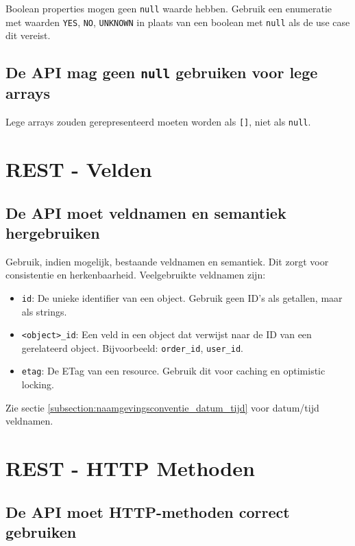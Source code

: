 Boolean properties mogen geen \texttt{null} waarde hebben. Gebruik een enumeratie met waarden \texttt{YES}, \texttt{NO}, \texttt{UNKNOWN} in plaats van een boolean met \texttt{null} als de use case dit vereist.

\subsection{De API mag geen \texttt{null} gebruiken voor lege arrays}
\label{subsection:geen_null_lege_arrays}

Lege arrays zouden gerepresenteerd moeten worden als \texttt{[]}, niet als \texttt{null}.

\section{REST - Velden}

\subsection{De API moet veldnamen en semantiek hergebruiken}
\label{subsection:veldnamen_semantiek_hergebruiken}

Gebruik, indien mogelijk, bestaande veldnamen en semantiek. Dit zorgt voor consistentie en herkenbaarheid. Veelgebruikte veldnamen zijn:

\begin{itemize}
    \item \texttt{id}: De unieke identifier van een object. Gebruik geen ID's als getallen, maar als strings.
    \item \texttt{<object>\_id}: Een veld in een object dat verwijst naar de ID van een gerelateerd object. Bijvoorbeeld: \texttt{order\_id}, \texttt{user\_id}.
    \item \texttt{etag}: De ETag van een resource. Gebruik dit voor caching en optimistic locking.
\end{itemize}

Zie sectie \ref{subsection:naamgevingsconventie_datum_tijd} voor datum/tijd veldnamen.

\section{REST - HTTP Methoden}

\subsection{De API moet HTTP-methoden correct gebruiken}
\label{subsection:correct_gebruik_http_methoden}

